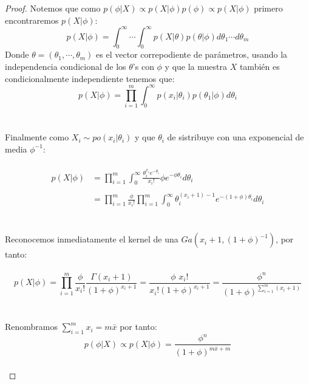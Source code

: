 \documentclass[11pt,letterpaper]{article}
\begin{document}
\begin{proof}
    Notemos que como $p(\phi|X)\varpropto p(X|\phi)p(\phi)\varpropto p(X|\phi) $ primero encontraremos $p(X|\phi)$:\,\\
    \begin{equation*}
        p(X|\phi)=\int_{0}^{\infty}\cdots\int_{0}^{\infty} p(X|\theta)p(\theta|\phi)d\theta_1\cdots d\theta_m
    \end{equation*}
    Donde $\theta=(\theta_1,\cdots,\theta_m)$ es el vector correpodiente de par\'ametros, usando la independencia condicional de los $\theta$'s con $\phi$ y que la muestra $X$ tambi\'en es condicionalmente independiente tenemos que:\,\\
    \begin{equation*}
        p(X|\phi)=\prod_{i=1}^m\int_{0}^{\infty}p(x_i|\theta_i)p(\theta_1|\phi)d\theta_i
    \end{equation*}\,\\
    \,\\
    Finalmente como $X_i\sim po(x_i|\theta_i)$ y que $\theta_i$ de sistribuye con una exponencial de media $\phi^{-1}$:\,\\
    \,\\
     \begin{align*}
        p(X|\phi)&=\prod_{i=1}^m\int_{0}^{\infty}\frac{\theta_i^{x_i}e^{-\theta_i}}{x_i!}\phi e^{-\phi\theta_i} d\theta_i\,\\
        \,\\
        &=\prod_{i=1}^m\frac{\phi}{x_i!}\prod_{i=1}^m\int_{0}^{\infty}\theta_i^{(x_i+1)-1} e^{-(1+\phi)\theta_i}d\theta_i
    \end{align*}\,\\
    \,\\
    Reconocemos inmediatamente el kernel de una $Ga(x_i+1,(1+\phi)^{-1})$, por tanto:\,\\
    \,\\
    \begin{equation*}
        p(X|\phi)=\prod_{i=1}^m\frac{\phi}{x_i!}\frac{\Gamma(x_i+1)}{(1+\phi)^{x_i+1}}=\frac{\phi\,\,x_i!}{x_i!(1+\phi)^{x_i+1}}=\frac{\phi^n}{(1+\phi)^{\sum_{i=1}^m(x_i+1)}}
    \end{equation*}\,\\
    \,\\
    Renombramos $\sum_{i=1}^mx_i=m\bar{x}$ por tanto:\,\\
    \begin{equation*}
        p(\phi|X)\propto p(X|\phi)=\frac{\phi^n}{(1+\phi)^{m\bar{x}+m}}
    \end{equation*}\,\\

\end{proof}
\end{document}
